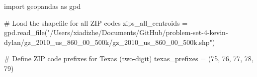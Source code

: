 \documentclass[
  letterpaper,
  DIV=11,
  numbers=noendperiod]{scrartcl}
\newenvironment{Shaded}{\begin{snugshade}}{\end{snugshade}}
\newcommand{\CommentTok}[1]{\textcolor[rgb]{0.37,0.37,0.37}{#1}}
\newcommand{\ImportTok}[1]{\textcolor[rgb]{0.00,0.46,0.62}{#1}}
\newcommand{\NormalTok}[1]{\textcolor[rgb]{0.00,0.23,0.31}{#1}}
\newcommand{\OperatorTok}[1]{\textcolor[rgb]{0.37,0.37,0.37}{#1}}
\newcommand{\StringTok}[1]{\textcolor[rgb]{0.13,0.47,0.30}{#1}}
\begin{document}
\begin{Shaded}
\begin{Highlighting}[]
\ImportTok{import}\NormalTok{ geopandas }\ImportTok{as}\NormalTok{ gpd}

\CommentTok{\# Load the shapefile for all ZIP codes}
\NormalTok{zips\_all\_centroids }\OperatorTok{=}\NormalTok{ gpd.read\_file(}\StringTok{"/Users/xiadizhe/Documents/GitHub/problem{-}set{-}4{-}kevin{-}dylan/gz\_2010\_us\_860\_00\_500k/gz\_2010\_us\_860\_00\_500k.shp"}\NormalTok{)}

\CommentTok{\# Define ZIP code prefixes for Texas (two{-}digit)}
\NormalTok{texas\_prefixes }\OperatorTok{=}\NormalTok{ (}\StringTok{\textquotesingle{}75\textquotesingle{}}\NormalTok{, }\StringTok{\textquotesingle{}76\textquotesingle{}}\NormalTok{, }\StringTok{\textquotesingle{}77\textquotesingle{}}\NormalTok{, }\StringTok{\textquotesingle{}78\textquotesingle{}}\NormalTok{, }\StringTok{\textquotesingle{}79\textquotesingle{}}\NormalTok{)}


\end{Highlighting}
\end{Shaded}
\end{document}
